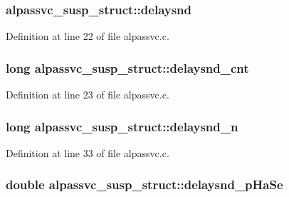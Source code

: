 \subsubsection[{\texorpdfstring{delaysnd}{delaysnd}}]{ alpassvc\+\_\+susp\+\_\+struct\+::delaysnd}\hypertarget{structalpassvc__susp__struct_ab8ad034a919c5ae32b33c39a3f0cdb97}{}\label{structalpassvc__susp__struct_ab8ad034a919c5ae32b33c39a3f0cdb97}


Definition at line 22 of file alpassvc.\+c.

\subsubsection[{\texorpdfstring{delaysnd\+\_\+cnt}{delaysnd_cnt}}]{\setlength{\rightskip}{0pt plus 5cm}long alpassvc\+\_\+susp\+\_\+struct\+::delaysnd\+\_\+cnt}\hypertarget{structalpassvc__susp__struct_a39f9bd7932d716e5552d7310eb1f6825}{}\label{structalpassvc__susp__struct_a39f9bd7932d716e5552d7310eb1f6825}


Definition at line 23 of file alpassvc.\+c.

\subsubsection[{\texorpdfstring{delaysnd\+\_\+n}{delaysnd_n}}]{\setlength{\rightskip}{0pt plus 5cm}long alpassvc\+\_\+susp\+\_\+struct\+::delaysnd\+\_\+n}\hypertarget{structalpassvc__susp__struct_aa20301b455dd292d6c697488afeb1ff5}{}\label{structalpassvc__susp__struct_aa20301b455dd292d6c697488afeb1ff5}


Definition at line 33 of file alpassvc.\+c.

\subsubsection[{\texorpdfstring{delaysnd\+\_\+p\+Ha\+Se}{delaysnd_pHaSe}}]{\setlength{\rightskip}{0pt plus 5cm}double alpassvc\+\_\+susp\+\_\+struct\+::delaysnd\+\_\+p\+Ha\+Se}\hypertarget{structalpassvc__susp__struct_a9940a036feb84ba5870143e8f9fd40b2}{}\label{structalpassvc__susp__struct_a9940a036feb84ba5870143e8f9fd40b2}


